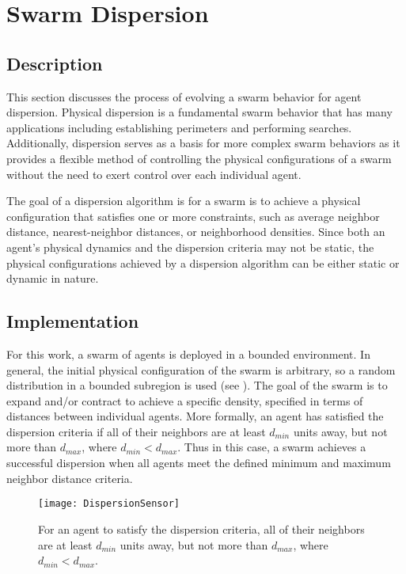 \section{Swarm Dispersion}
\subsection{Description}
This section discusses the process of evolving a swarm behavior for agent dispersion.  Physical dispersion is a fundamental swarm behavior that has many applications including establishing perimeters and performing searches.  Additionally, dispersion serves as a basis for more complex swarm behaviors as it provides a flexible method of controlling the physical configurations of a swarm without the need to exert control over each individual agent.

The goal of a dispersion algorithm is for a swarm is to achieve a physical configuration that satisfies one or more constraints, such as average neighbor distance, nearest-neighbor distances, or neighborhood densities.  Since both an agent's physical dynamics and the dispersion criteria may not be static, the physical configurations achieved by a dispersion algorithm can be either static or dynamic in nature.

\subsection{Implementation}

For this work, a swarm of agents is deployed in a bounded environment.  In general, the initial physical configuration of the swarm is arbitrary, so a random distribution in a bounded subregion is used (see ).  The goal of the swarm is to expand and/or contract to achieve a specific density, specified in terms of distances between individual agents.  More formally, an agent has satisfied the dispersion criteria if all of their neighbors are at least $d_{min}$ units away, but not more than $d_{max}$, where $d_{min} < d_{max}$.  Thus in this case, a swarm achieves a successful dispersion when all agents meet the defined minimum and maximum neighbor distance criteria.

\begin{figure}[ht]
  \centering
  \texttt{[image: DispersionSensor]}
  \caption[Dispersion criteria for a single agent.]{For an agent to satisfy the dispersion criteria, all of their neighbors are at least $d_{min}$ units away, but not more than $d_{max}$, where $d_{min} < d_{max}$.}
  \label{fig:DispersionSensor}
\end{figure}

